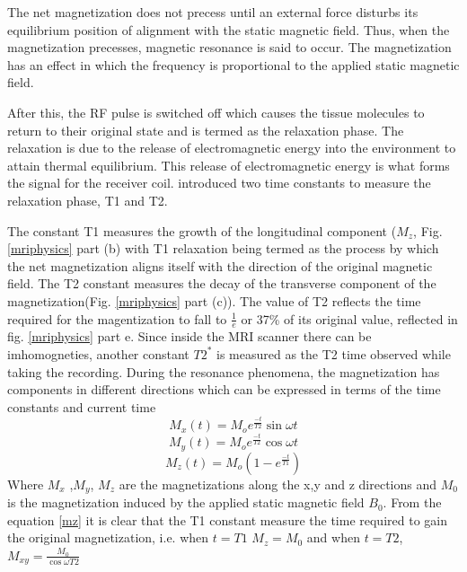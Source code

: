 \documentclass[msthesis.tex]{subfiles}
\begin{document}
The net magnetization does not precess until an external force disturbs its equilibrium position of alignment with the static magnetic field. Thus, when the magnetization precesses, magnetic resonance is said to occur. The magnetization has an effect in which the frequency is proportional to the applied static magnetic field.

After this, the RF pulse is switched off which causes the tissue molecules to return to their original state and is termed as the relaxation phase. The relaxation is due to the release of electromagnetic energy into the environment to attain thermal equilibrium. This release of electromagnetic energy is what forms the signal for the receiver coil. \cite{PhysRev.70.460} introduced two time constants to measure the relaxation phase, T1 and T2.

The constant T1  measures the growth of the longitudinal component  ($M_z$, Fig. \ref{mriphysics} part (b) with T1 relaxation being termed as the process by which the net magnetization aligns itself with the direction of the original magnetic field. The T2 constant measures the decay of the transverse component of the magnetization(Fig. \ref{mriphysics} part (c)). The value of T2 reflects the time required for the magentization to fall to $\frac{1}{e}$ or 37\% of its original value, reflected in fig. \ref{mriphysics} part e. Since inside the MRI scanner there can be imhomogneties, another constant $T2^*$ is measured as the T2 time observed while taking the recording.
During the resonance phenomena, the magnetization has components in different directions which can be expressed in terms of the time constants and current time
\begin{equation}
    M_x(t) = M_o e^{\frac{−t}{T2}} \sin{ \omega t}
    \label{mx}
\end{equation}
\begin{equation}
    M_y(t) = M_o e^{\frac{-t}{T2}} \cos{\omega {t}}
    \label{my}
\end{equation}
\begin{equation}
    M_z(t) = M_o (1 − e^{{\frac{−t}{T1}}})
    \label{mz}
\end{equation}
Where $M_x$ ,$M_y$, $M_z$ are the magnetizations along the x,y and z directions and $M_0$ is the magnetization induced by the applied static magnetic field $B_0$. From the equation \ref{mz} it is clear that the T1 constant measure the time required to gain the original magnetization, i.e. when $t=T1$
$M_z = M_0$ and when $t=T2$, $M_{xy} = \frac{M_0}{\cos{\omega T2}}$
\end{document}
